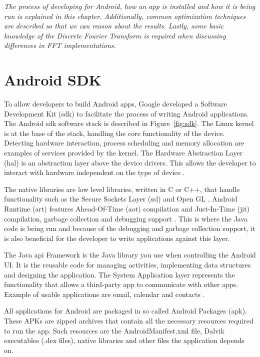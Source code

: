 \textit{The process of developing for Android, how an app is installed and how it is being run is explained in this chapter. Additionally, common optimization techniques are described so that we can reason about the results. Lastly, some basic knowledge of the Discrete Fourier Transform is required when discussing differences in FFT implementations. }

\section{Android SDK}
To allow developers to build Android apps, Google developed a Software Development Kit (\gls{sdk}) to facilitate the process of writing Android applications. The Android \gls{sdk} software stack is described in Figure~\ref{fig:sdk}. The Linux kernel is at the base of the stack, handling the core functionality of the device. Detecting hardware interaction, process scheduling and memory allocation are examples of services provided by the kernel. The Hardware Abstraction Layer (\gls{hal}) is an abstraction layer above the device drivers. This allows the developer to interact with hardware independent on the type of device \cite{android:hal}.

The native libraries are low level libraries, written in C or C++, that handle functionality such as the Secure Sockets Layer (\gls{ssl}) and Open GL \cite{komatineni2012pro}. Android Runtime (\gls{art}) features Ahead-Of-Time (\gls{aot}) compilation and Just-In-Time (\gls{jit}) compilation, garbage collection and debugging support \cite{android:sdk:stack}. This is where the Java code is being run and because of the debugging and garbage collection support, it is also beneficial for the developer to write applications against this layer.

The Java \gls{api} Framework is the Java library you use when controlling the Android UI. It is the reusable code for managing activities, implementing data structures and designing the application. The System Application layer represents the functionality that allows a third-party app to communicate with other apps. Example of usable applications are email, calendar and contacts \cite{android:sdk:stack}.

All applications for Android are packaged in so called Android Packages (\gls{apk}). These APKs are zipped archives that contain all the necessary resources required to run the app. Such resources are the AndroidManifest.xml file, Dalvik executables (.dex files), native libraries and other files the application depends on.

